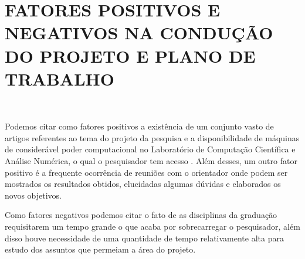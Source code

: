\documentclass[12pt,letterpaper]{article}
\begin{document}
\newpage


\newpage
\newpage
\section*{\centering \textbf{FATORES POSITIVOS E NEGATIVOS NA CONDUÇÃO DO PROJETO E PLANO DE TRABALHO}}
\hrulefill \\

\vspace{0.5cm}

Podemos citar como fatores positivos a existência de um conjunto vasto de artigos referentes ao tema do projeto da pesquisa e a disponibilidade de máquinas de considerável poder computacional no Laboratório de Computação Científica e Análise Numérica, o qual o pesquisador tem acesso . Além desses, um outro fator positivo é a frequente ocorrência de reuniões com o orientador onde podem ser mostrados os resultados obtidos, elucidadas algumas dúvidas e elaborados os novos objetivos. 

Como fatores negativos podemos citar o fato de as disciplinas da graduação requisitarem um tempo grande o que acaba por sobrecarregar o pesquisador, além disso houve necessidade de uma quantidade de tempo relativamente alta para estudo dos assuntos que permeiam a área do projeto.  


\end{document}
